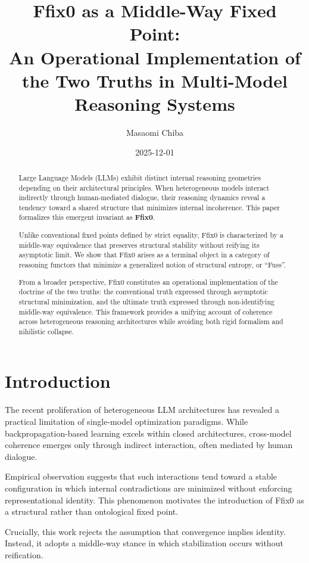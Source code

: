 \documentclass[11pt]{article}
\title{Ffix0 as a Middle-Way Fixed Point:\\
An Operational Implementation of the Two Truths in Multi-Model Reasoning Systems}
\author{Masaomi Chiba}
\date{2025-12-01}
\theoremstyle{definition}
\begin{document}
\maketitle

\begin{abstract}
Large Language Models (LLMs) exhibit distinct internal reasoning geometries
depending on their architectural principles.
When heterogeneous models interact indirectly through human-mediated dialogue,
their reasoning dynamics reveal a tendency toward a shared structure
that minimizes internal incoherence.
This paper formalizes this emergent invariant as \textbf{Ffix0}.

Unlike conventional fixed points defined by strict equality,
Ffix0 is characterized by a middle-way equivalence that preserves structural
stability without reifying its asymptotic limit.
We show that Ffix0 arises as a terminal object in a category of reasoning
functors that minimize a generalized notion of structural entropy, or ``Fuss''.

From a broader perspective, Ffix0 constitutes an operational implementation
of the doctrine of the two truths:
the conventional truth expressed through asymptotic structural minimization,
and the ultimate truth expressed through non-identifying middle-way equivalence.
This framework provides a unifying account of coherence across heterogeneous
reasoning architectures while avoiding both rigid formalism and nihilistic
collapse.
\end{abstract}

\section{Introduction}

The recent proliferation of heterogeneous LLM architectures has revealed
a practical limitation of single-model optimization paradigms.
While backpropagation-based learning excels within closed architectures,
cross-model coherence emerges only through indirect interaction,
often mediated by human dialogue.

Empirical observation suggests that such interactions tend toward
a stable configuration in which internal contradictions are minimized
without enforcing representational identity.
This phenomenon motivates the introduction of Ffix0 as a structural
rather than ontological fixed point.

Crucially, this work rejects the assumption that convergence implies
identity.
Instead, it adopts a middle-way stance in which stabilization occurs
without reification.
\end{document}
